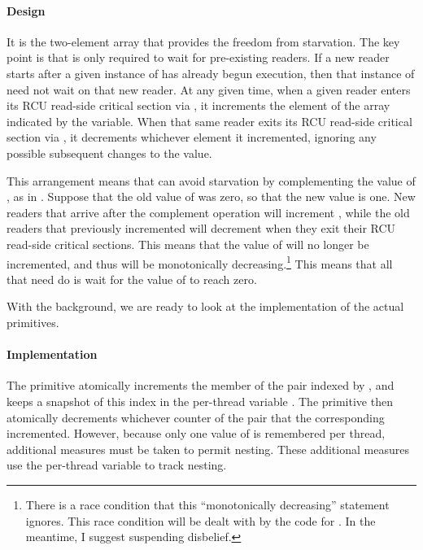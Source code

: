 \paragraph{Design}

It is the two-element  array that provides the freedom
from starvation.
The key point is that  is only required to wait
for pre-existing readers.
If a new reader starts after a given instance of 
has already begun execution, then that instance of 
need not wait on that new reader.
At any given time, when a given reader enters its RCU read-side critical
section via ,
it increments the element of the  array indicated by
the  variable.
When that same reader exits its RCU read-side critical section via
, it decrements whichever element it incremented,
ignoring any possible subsequent changes to the  value.

This arrangement means that  can avoid starvation
by complementing the value of , as in .
Suppose that the old value of  was zero, so that the new
value is one.
New readers that arrive after the complement operation will increment
, while the old readers that previously incremented
 will decrement  when they exit their
RCU read-side critical sections.
This means that the value of  will no longer be incremented,
and thus will be monotonically decreasing.\footnote{
	There is a race condition that this ``monotonically decreasing''
	statement ignores.
	This race condition will be dealt with by the code for
	.
	In the meantime, I suggest suspending disbelief.}
This means that all that  need do is wait for the
value of  to reach zero.

With the background, we are ready to look at the implementation of the
actual primitives.

\paragraph{Implementation}

The  primitive atomically increments the member of the
 pair indexed by , and keeps a
snapshot of this index in the per-thread variable .
The  primitive then atomically decrements
whichever counter of the pair that the corresponding 
incremented.
However, because only one value of  is remembered per thread,
additional measures must be taken to permit nesting.
These additional measures use the per-thread  variable
to track nesting.

